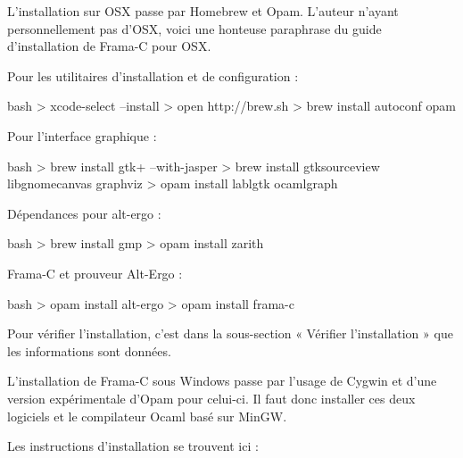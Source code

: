 \documentclass[middle]{zmdocument}
\begin{document}


L'installation sur OSX passe par Homebrew et Opam. L'auteur n'ayant
personnellement pas d'OSX, voici une honteuse paraphrase du guide 
d'installation de Frama-C pour OSX.



Pour les utilitaires d'installation et de configuration :



\begin{CodeBlock}{bash}
> xcode-select --install 
> open http://brew.sh
> brew install autoconf opam 
\end{CodeBlock}



Pour l'interface graphique :



\begin{CodeBlock}{bash}
> brew install gtk+ --with-jasper
> brew install gtksourceview libgnomecanvas graphviz
> opam install lablgtk ocamlgraph 
\end{CodeBlock}



Dépendances pour alt-ergo :



\begin{CodeBlock}{bash}
> brew install gmp
> opam install zarith
\end{CodeBlock}



Frama-C et prouveur Alt-Ergo :



\begin{CodeBlock}{bash}
> opam install alt-ergo
> opam install frama-c
\end{CodeBlock}



Pour vérifier l'installation, c'est dans la sous-section « Vérifier l'installation »
que les informations sont données.





L'installation de Frama-C sous Windows passe par l'usage de Cygwin et d'une
version expérimentale d'Opam pour celui-ci. Il faut donc installer ces deux
logiciels et le compilateur Ocaml basé sur MinGW.



Les instructions d'installation se trouvent ici :



\end{document}
